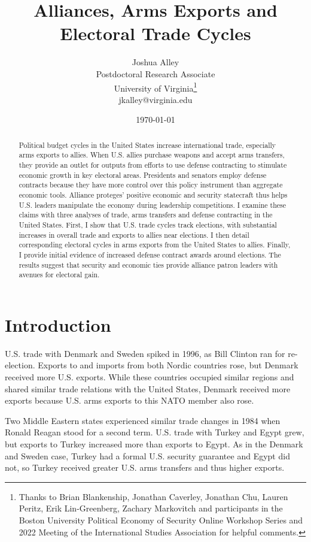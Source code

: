 \documentclass[12pt]{article}
\title{\textbf{Alliances, Arms Exports and Electoral Trade Cycles}}
\author{Joshua Alley \\
Postdoctoral Research Associate \\
University of Virginia\thanks{Thanks to Brian Blankenship, Jonathan Caverley, Jonathan Chu, Lauren Peritz, Erik Lin-Greenberg, Zachary Markovitch and participants in the Boston University Political Economy of Security Online Workshop Series and 2022 Meeting of the International Studies Association for helpful comments.} \\
jkalley@virginia.edu
}
\date{\today}
\begin{document}
\maketitle 

\begin{abstract} 
Political budget cycles in the United States increase international trade, especially arms exports to allies. 
When U.S. allies purchase weapons and accept arms transfers, they provide an outlet for outputs from efforts to use defense contracting to stimulate economic growth in key electoral areas.
Presidents and senators employ defense contracts because they have more control over this policy instrument than aggregate economic tools.
Alliance proteges' positive economic and security statecraft thus helps U.S. leaders manipulate the economy during leadership competitions.  
I examine these claims with three analyses of trade, arms transfers and defense contracting in the United States. 
First, I show that U.S. trade cycles track elections, with substantial increases in overall trade and exports to allies near elections.
I then detail corresponding electoral cycles in arms exports from the United States to allies. 
Finally, I provide initial evidence of increased defense contract awards around elections.
The results suggest that security and economic ties provide alliance patron leaders with avenues for electoral gain. 
\end{abstract} 


\newpage 
\doublespace 


\section{Introduction}


U.S. trade with Denmark and Sweden spiked in 1996, as Bill Clinton ran for re-election.
Exports to and imports from both Nordic countries rose, but Denmark received more U.S. exports.
While these countries occupied similar regions and shared similar trade relations with the United States, Denmark received more exports because U.S. arms exports to this NATO member also rose.


Two Middle Eastern states experienced similar trade changes in 1984 when Ronald Reagan stood for a second term.
U.S. trade with Turkey and Egypt grew, but exports to Turkey increased more than exports to Egypt. 
As in the Denmark and Sweden case, Turkey had a formal U.S. security guarantee and Egypt did not, so Turkey received greater U.S. arms transfers and thus higher exports. 
\end{document}
